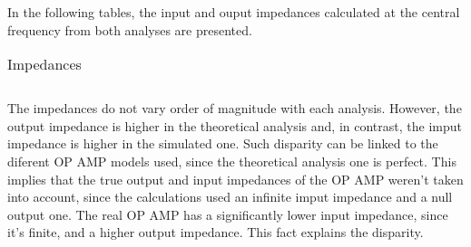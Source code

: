 In the following tables, the input and ouput impedances  calculated at the central frequency from both analyses are presented.\\
\FloatBarrier
\begin{table}[h]
  \centering
  \begin{tabular}{|c|c|c|}
    \hline    
    
    
    
    \hline
  \end{tabular}
  \caption{Impedances}
\end{table}
\FloatBarrier   
The impedances do not vary order of magnitude with each analysis. However, the output impedance is higher in the theoretical analysis and, in contrast, the imput impedance is higher in the simulated one. Such disparity can be linked to the diferent OP AMP models used, since the theoretical analysis one is perfect. This implies that the true output and input impedances of the OP AMP weren't taken into account, since the calculations used an infinite imput impedance and a null output one. The real OP AMP has a significantly lower input impedance, since it's finite, and a higher output impedance. This fact explains the disparity. 


